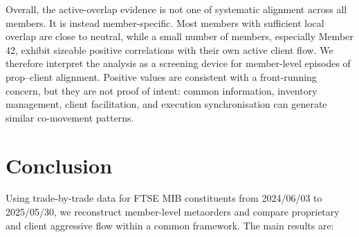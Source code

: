\documentclass[11pt]{article}
\begin{document}
Overall, the active-overlap evidence is not one of systematic alignment across
all members. It is instead member-specific. Most members with sufficient local
overlap are close to neutral, while a small number of members, especially
Member 42, exhibit sizeable positive correlations with their own active
client flow. We therefore interpret the analysis as a screening device for
member-level episodes of prop--client alignment. Positive values are consistent
with a front-running concern, but they are not proof of intent: common
information, inventory management, client facilitation, and execution
synchronisation can generate similar co-movement patterns.


\FloatBarrier

\section{Conclusion}
\label{sec:conclusion}

Using trade-by-trade data for FTSE MIB constituents from 2024/06/03 to 2025/05/30, we reconstruct member-level metaorders and
compare proprietary and client aggressive flow within a common framework. The main results are:
\end{document}

